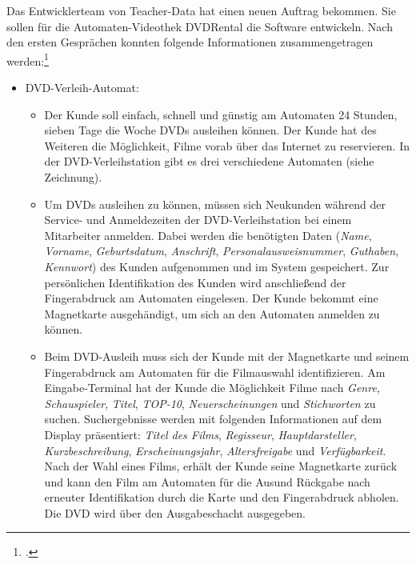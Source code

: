 \documentclass{bschlangaul-aufgabe}
\begin{document}

Das Entwicklerteam von Teacher-Data hat einen neuen Auftrag bekommen.
Sie sollen für die Automaten-Videothek DVDRental die Software
entwickeln. Nach den ersten Gesprächen konnten folgende Informationen
zusammengetragen werden:\footcite{sosy:ab:2}

\begin{itemize}
\item DVD-Verleih-Automat:

\begin{itemize}
\item Der Kunde soll einfach, schnell und günstig am Automaten 24
Stunden, sieben Tage die Woche DVDs ausleihen können. Der Kunde hat des
Weiteren die Möglichkeit, Filme vorab über das Internet zu reservieren.
In der DVD-Verleihstation gibt es drei verschiedene Automaten (siehe
Zeichnung).

\item Um DVDs ausleihen zu können, müssen sich Neukunden während der
Service- und Anmeldezeiten der DVD-Verleihstation bei einem Mitarbeiter
anmelden. Dabei werden die benötigten Daten (\emph{Name},
\emph{Vorname}, \emph{Geburtsdatum}, \emph{Anschrift},
\emph{Personalausweisnummer}, \emph{Guthaben}, \emph{Kennwort}) des
Kunden aufgenommen und im System gespeichert. Zur persönlichen
Identifikation des Kunden wird anschließend der Fingerabdruck am
Automaten eingelesen. Der Kunde bekommt eine Magnetkarte ausgehändigt,
um sich an den Automaten anmelden zu können.

\item Beim DVD-Ausleih muss sich der Kunde mit der Magnetkarte und
seinem Fingerabdruck am Automaten für die Filmauswahl identifizieren. Am
Eingabe-Terminal hat der Kunde die Möglichkeit Filme nach \emph{Genre},
\emph{Schauspieler}, \emph{Titel}, \emph{TOP-10},
\emph{Neuerscheinungen} und \emph{Stichworten} zu suchen. Suchergebnisse
werden mit folgenden Informationen auf dem Display präsentiert:
\emph{Titel des Films}, \emph{Regisseur}, \emph{Hauptdarsteller},
\emph{Kurzbeschreibung}, \emph{Erscheinungsjahr}, \emph{Altersfreigabe}
und \emph{Verfügbarkeit}. Nach der Wahl eines Films, erhält der Kunde
seine Magnetkarte zurück und kann den Film am Automaten für die Ausund
Rückgabe nach erneuter Identifikation durch die Karte und den
Fingerabdruck abholen. Die DVD wird über den Ausgabeschacht ausgegeben.


\end{itemize}
\end{itemize}
\end{document}
